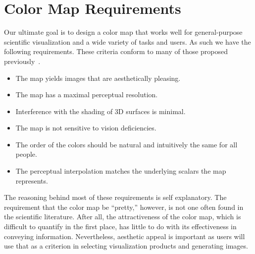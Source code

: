 \documentclass[review,journal]{vgtc}         %
\newcommand{\lcite}[1]{~\cite{#1}}
\begin{document}
\section{Color Map Requirements}
\label{sec:ColorMapRequirements}

Our ultimate goal is to design a color map that works well for
general-purpose scientific visualization and a wide
variety of tasks and users.  As such we have the following requirements.
These criteria conform to many of those proposed
previously\lcite{Fortner97,Levkowitz92,Light04}.

\begin{itemize}
\item The map yields images that are aesthetically pleasing.
\item The map has a maximal perceptual resolution.
\item Interference with the shading of 3D surfaces is minimal.
\item The map is not sensitive to vision deficiencies.
\item The order of the colors should be natural and intuitively the same
  for all people.
\item The perceptual interpolation matches the underlying scalars the map
  represents.
\end{itemize}

The reasoning behind most of these requirements is self explanatory.  The
requirement that the color map be ``pretty,'' however, is not one often
found in the scientific literature.  After all, the attractiveness of the
color map, which is difficult to quantify in the first place, has little to
do with its effectiveness in conveying information.  Nevertheless, aesthetic
appeal is important as users will use that as a criterion in selecting
visualization products and generating images.

\end{document}
